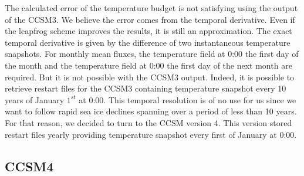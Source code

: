 The calculated error of the temperature budget is not satisfying using the output of the CCSM3. We believe the error comes from the temporal derivative. Even if the leapfrog scheme improves the results, it is still an approximation. The exact temporal derivative is given by the difference of two instantaneous temperature snapshots. For monthly mean fluxes, the temperature field at 0:00 the first day of the month and the temperature field at 0:00 the first day of the next month are required. But it is not possible with the CCSM3 output. Indeed, it is possible to retrieve restart files for the CCSM3 containing temperature snapshot every 10 years of January $1^{st}$ at 0:00. This temporal resolution is of no use for us since we want to follow rapid sea ice declines spanning over a period of less than 10 years. For that reason, we decided to turn to the CCSM version 4. This version stored restart files yearly providing temperature snapshot every first of January at 0:00.  

\subsection{CCSM4}\label{c4}

